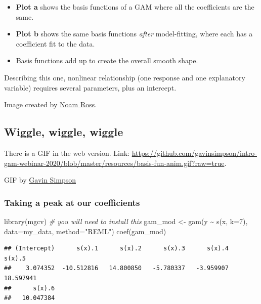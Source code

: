 \documentclass[
  openany]{book}
\newenvironment{Shaded}{\begin{snugshade}}{\end{snugshade}}
\newcommand{\AttributeTok}[1]{\textcolor[rgb]{0.77,0.63,0.00}{#1}}
\newcommand{\CommentTok}[1]{\textcolor[rgb]{0.56,0.35,0.01}{\textit{#1}}}
\newcommand{\DecValTok}[1]{\textcolor[rgb]{0.00,0.00,0.81}{#1}}
\newcommand{\FunctionTok}[1]{\textcolor[rgb]{0.00,0.00,0.00}{#1}}
\newcommand{\NormalTok}[1]{#1}
\newcommand{\OtherTok}[1]{\textcolor[rgb]{0.56,0.35,0.01}{#1}}
\newcommand{\SpecialCharTok}[1]{\textcolor[rgb]{0.00,0.00,0.00}{#1}}
\newcommand{\StringTok}[1]{\textcolor[rgb]{0.31,0.60,0.02}{#1}}
\providecommand{\tightlist}{%
  \setlength{\itemsep}{0pt}\setlength{\parskip}{0pt}}
\begin{document}
\begin{itemize}
\tightlist
\item
  \textbf{Plot a} shows the basis functions of a GAM where all the coefficients are the same.\\
\item
  \textbf{Plot b} shows the same basis functions \emph{after} model-fitting, where each has a coefficient fit to the data.
\item
  Basis functions add up to create the overall smooth shape.
\end{itemize}

Describing this one, nonlinear relationship (one response and one explanatory variable) requires several parameters, plus an intercept.

Image created by \href{https://github.com/noamross/gams-in-r-course/blob/master/images/basis-functions-1.png}{Noam Ross}.

\hypertarget{wiggle-wiggle-wiggle}{%
\subsection{Wiggle, wiggle, wiggle}\label{wiggle-wiggle-wiggle}}

There is a GIF in the web version. Link: \url{https://github.com/gavinsimpson/intro-gam-webinar-2020/blob/master/resources/basis-fun-anim.gif?raw=true}.

GIF by \href{https://github.com/gavinsimpson}{Gavin Simpson}

\hypertarget{taking-a-peak-at-our-coefficients}{%
\subsubsection{Taking a peak at our coefficients}\label{taking-a-peak-at-our-coefficients}}

\begin{Shaded}
\begin{Highlighting}[]
\FunctionTok{library}\NormalTok{(mgcv) }\CommentTok{\# you will need to install this}
\NormalTok{gam\_mod }\OtherTok{\textless{}{-}} \FunctionTok{gam}\NormalTok{(y }\SpecialCharTok{\textasciitilde{}} \FunctionTok{s}\NormalTok{(x, }\AttributeTok{k=}\DecValTok{7}\NormalTok{), }\AttributeTok{data=}\NormalTok{my\_data, }\AttributeTok{method=}\StringTok{"REML"}\NormalTok{)}
\FunctionTok{coef}\NormalTok{(gam\_mod)}
\end{Highlighting}
\end{Shaded}

\begin{verbatim}
## (Intercept)      s(x).1      s(x).2      s(x).3      s(x).4      s(x).5 
##    3.074352  -10.512816   14.800850   -5.780337   -3.959907   18.597941 
##      s(x).6 
##   10.047384
\end{verbatim}
\end{document}
